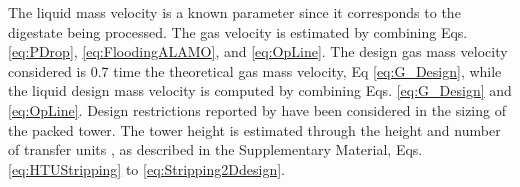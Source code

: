 \begin{refsection}[referencesCh6]
%


The
liquid mass velocity is a known parameter since it corresponds to the digestate being processed. The
gas velocity is estimated by combining Eqs. \ref{eq:PDrop}, \ref{eq:FloodingALAMO}, and \ref{eq:OpLine}. The design gas mass velocity considered is 0.7 time the theoretical gas mass velocity, Eq \ref{eq:G_Design}, while the liquid design mass velocity is computed by combining Eqs. \ref{eq:G_Design} and \ref{eq:OpLine}.
Design restrictions reported by \citet{Branan} have been considered in the sizing of the packed tower.
The tower height is estimated through the height and number of transfer units \citep{Metcalf}, as described in the Supplementary Material, Eqs. \ref{eq:HTUStripping} to \ref{eq:Stripping2Ddesign}.



\end{refsection}
